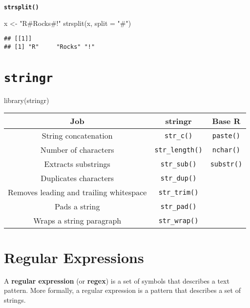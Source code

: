 \documentclass[
]{book}
\newenvironment{Shaded}{\begin{snugshade}}{\end{snugshade}}
\newcommand{\AttributeTok}[1]{\textcolor[rgb]{0.77,0.63,0.00}{#1}}
\newcommand{\FunctionTok}[1]{\textcolor[rgb]{0.00,0.00,0.00}{#1}}
\newcommand{\NormalTok}[1]{#1}
\newcommand{\OtherTok}[1]{\textcolor[rgb]{0.56,0.35,0.01}{#1}}
\newcommand{\StringTok}[1]{\textcolor[rgb]{0.31,0.60,0.02}{#1}}
\begin{document}
{\textbf{\texttt{strsplit()}
}}

\begin{Shaded}
\begin{Highlighting}[]
\NormalTok{x }\OtherTok{\textless{}{-}} \StringTok{"R\#Rocks\#!"}
\FunctionTok{strsplit}\NormalTok{(x, }\AttributeTok{split =} \StringTok{"\#"}\NormalTok{)}
\end{Highlighting}
\end{Shaded}

\begin{verbatim}
## [[1]]
## [1] "R"     "Rocks" "!"
\end{verbatim}

\hypertarget{stringr}{%
\section{\texorpdfstring{\texttt{stringr}}{stringr}}\label{stringr}}

\begin{Shaded}
\begin{Highlighting}[]
\FunctionTok{library}\NormalTok{(stringr)}
\end{Highlighting}
\end{Shaded}

\begin{longtable}[]{@{}ccc@{}}
\toprule
Job & stringr & Base R \\
\midrule
\endhead
String concatenation & \texttt{str\_c()} & \texttt{paste()} \\
Number of characters & \texttt{str\_length()} & \texttt{nchar()} \\
Extracts substrings & \texttt{str\_sub()} & \texttt{substr()} \\
Duplicates characters & \texttt{str\_dup()} & \\
Removes leading and trailing whitespace & \texttt{str\_trim()} & \\
Pads a string & \texttt{str\_pad()} & \\
Wraps a string paragraph & \texttt{str\_wrap()} & \\
\bottomrule
\end{longtable}

\hypertarget{regular-expressions}{%
\section{Regular Expressions}\label{regular-expressions}}

A \textbf{regular expression} (or \textbf{regex}) is a set of symbols that describes a text pattern. More formally, a regular expression is a pattern that describes a set of strings.
\end{document}
